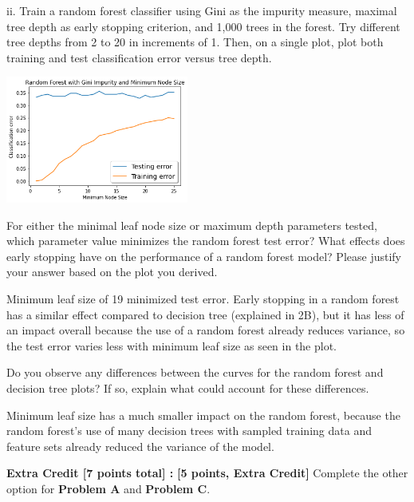 ii. Train a random forest classifier using Gini as the impurity measure, maximal tree depth as early stopping criterion, and 1,000 trees in the forest. Try different tree depths from 2 to 20 in increments of 1. Then, on a single plot, plot both training and test classification error versus tree depth.

\begin{solution}

    \includegraphics[width=0.45\textwidth]{images/2c.png}
\end{solution}

\problem[6]
For either the minimal leaf node size or maximum depth parameters tested, which parameter value minimizes the random forest test error? What effects does early stopping have on the performance of a random forest model?
Please justify your answer based on the plot you derived.

\pagebreak

\begin{solution}
    Minimum leaf size of 19 minimized test error.
    Early stopping in a random forest has a similar effect compared to decision tree (explained in 2B), but it has less of an impact overall because the use of a random forest already reduces variance, so the test error varies less with minimum leaf size as seen in the plot.
\end{solution}

\problem[4]
Do you observe any differences between the curves for the random forest and decision tree plots? If so, explain what could account for these differences.

\begin{solution}
    Minimum leaf size has a much smaller impact on the random forest, because the random forest's use of many decision trees with sampled training data and feature sets already reduced the variance of the model.
\end{solution}

\textbf{Extra Credit [7 points total] :} \problem\textbf{[5 points, Extra Credit]} Complete the other option for \textbf{Problem A }and \textbf{Problem C}.

